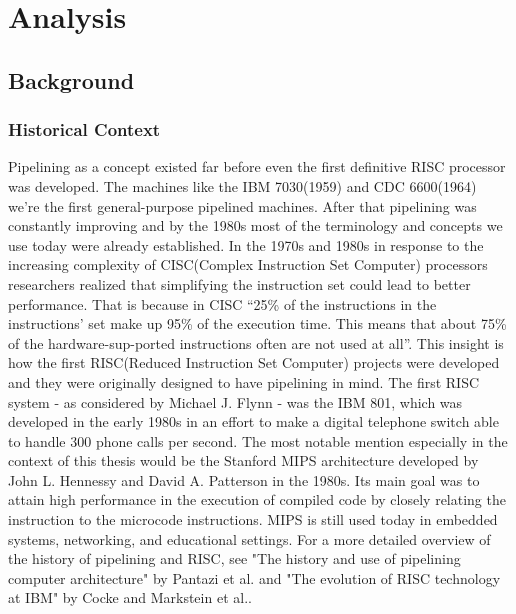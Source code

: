 \chapter{Analysis}

\section{Background}
\subsection{Historical Context}
Pipelining as a concept existed far before even the first definitive RISC processor was developed.
The machines like the IBM 7030(1959) and CDC 6600(1964) we're the first general-purpose pipelined machines. After that pipelining was constantly improving and by the 1980s most of the terminology and concepts we use today were already established\cite{pantazi2013history}. In the 1970s and 1980s in response to the increasing complexity of CISC(Complex Instruction Set Computer) processors researchers realized that simplifying the instruction set could lead to better performance. That is because in CISC \enquote{25\% of the instructions in the instructions' set make up 95\% of the execution time. This means that about 75\% of the hardware-sup-ported instructions often are not used at all}\cite{jamil1995risc}. This insight is how the first RISC(Reduced Instruction Set Computer) projects were developed\cite{aletan1992overview} and they were originally designed to have pipelining in mind\cite{pantazi2013history}. The first RISC system - as considered by Michael J. Flynn - was the IBM 801\cite{flynn1995computer}, which was developed in the early 1980s in an effort to make a digital telephone switch able to handle 300 phone calls per second\cite{cocke1990evolution}. The most notable mention especially  in the context of this thesis would be the Stanford MIPS architecture developed by John L. Hennessy and David A. Patterson in the 1980s. Its main goal was to attain high performance in the execution of compiled code by closely relating the instruction to the microcode instructions\cite{hennessy1982mips}. MIPS is still used today in embedded systems, networking, and educational settings. For a more detailed overview of the history of pipelining and RISC, see "The history and use of pipelining computer architecture" by Pantazi et al.\cite{pantazi2013history} and "The evolution of RISC technology at IBM" by Cocke and Markstein et al.\cite{cocke1990evolution}.

